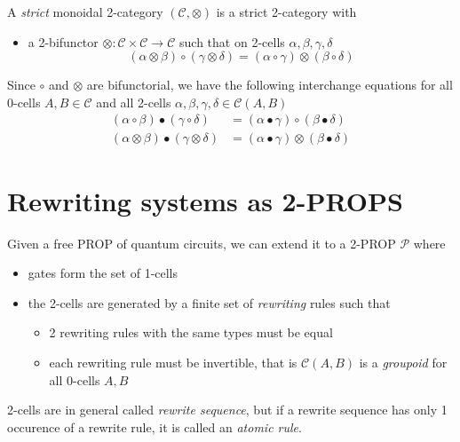 \documentclass[a4paper]{article}
\begin{document}
\begin{definition}\label{def:monoidal-two-cat}
A \emph{strict} monoidal 2-category $(\mathcal{C}, \otimes)$ is a strict
2-category with
\begin{itemize}
\item a 2-bifunctor $\otimes: \mathcal{C} \times \mathcal{C} \to \mathcal{C}$
  such that on 2-cells $\alpha, \beta, \gamma, \delta$
\[
(\alpha \otimes \beta) \circ (\gamma \otimes \delta) = (\alpha \circ \gamma)
  \otimes (\beta \circ \delta)
\]
\end{itemize}
\end{definition}


\begin{remark}
Since $\circ$ and $\otimes$ are bifunctorial, we have the following
interchange equations for all 0-cells $A, B \in \mathcal{C}$ and all 2-cells
  $\alpha, \beta, \gamma, \delta \in \mathcal{C}(A, B)$
\begin{align}
(\alpha \circ \beta) \bullet (\gamma \circ \delta) &= (\alpha \bullet \gamma)
  \circ (\beta \bullet \delta) \\
(\alpha \otimes \beta) \bullet (\gamma \otimes \delta) &= (\alpha \bullet
  \gamma) \otimes (\beta \bullet \delta)
\end{align}
\end{remark}

\section{Rewriting systems as 2-PROPS}
\label{sec:rewriting}

\begin{definition}
Given a free PROP of quantum circuits, we can extend it to a 2-PROP
  $\mathcal{P}$ where
\begin{itemize}
\item gates form the set of 1-cells 
\item the 2-cells are generated by a finite set of \emph{rewriting} rules such
  that
\begin{itemize}
\item 2 rewriting rules with the same types must be equal
\item each rewriting rule must be invertible, that is $\mathcal{C}(A, B)$ is a
  \emph{groupoid} for all 0-cells $A, B$
\end{itemize}
\end{itemize}

2-cells are in general called \emph{rewrite sequence}, but if a rewrite sequence
  has only 1 occurence of a rewrite rule, it is called an \emph{atomic rule}.
\end{definition}
\end{document}
